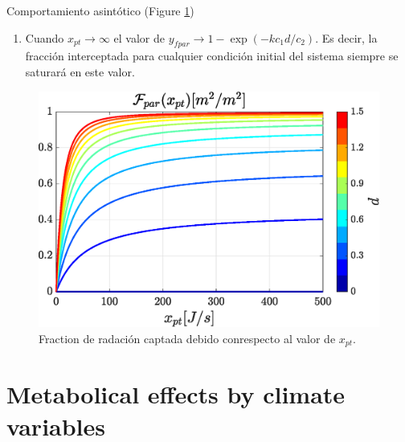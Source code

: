 Comportamiento asintótico (Figure \ref{fig:Fpar})
\begin{enumerate}
    \item Cuando $x_{pt} \to \infty$ el valor de $y_{fpar} \to 1 - \exp(-kc_1 d/c_2)$. Es decir, la fracción interceptada para cualquier condición initial del sistema siempre se saturará en este valor.
\end{enumerate}
\begin{figure}
    \centering
    \includegraphics[scale=0.5]{img/F_x_pt.eps}
    \caption{Fraction de radación captada debido conrespecto al valor de $x_{pt}$. }
    \label{fig:Fpar}
\end{figure}  



\section{Metabolical effects by climate variables}



